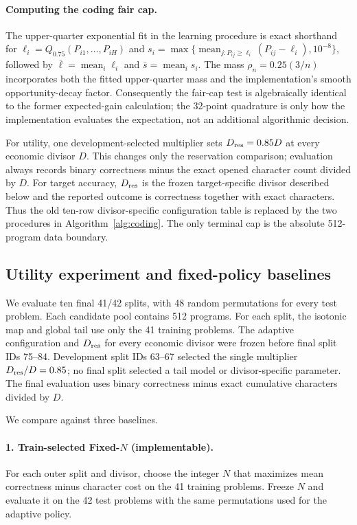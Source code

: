 \paragraph{Computing the coding fair cap.}
The upper-quarter exponential fit in the learning procedure is exact shorthand
for $\ell_i=Q_{0.75}(P_{i1},\ldots,P_{iH})$ and
$s_i=\max\{\operatorname{mean}_{j:P_{ij}\ge\ell_i}
(P_{ij}-\ell_i),10^{-8}\}$, followed by
$\bar\ell=\operatorname{mean}_i\ell_i$ and
$\bar s=\operatorname{mean}_i s_i$.  The mass
$\rho_n=0.25(3/n)$ incorporates both the fitted upper-quarter mass and the
implementation's smooth opportunity-decay factor.  Consequently the fair-cap
test is algebraically identical to the former expected-gain calculation; the
32-point quadrature is only how the implementation evaluates the expectation,
not an additional algorithmic decision.

For utility, one development-selected multiplier sets
$D_{\rm res}=0.85D$ at every economic divisor $D$.  This changes only the
reservation comparison; evaluation always records binary correctness minus
the exact opened character count divided by $D$.  For target accuracy,
$D_{\rm res}$ is the frozen target-specific divisor described below and the
reported outcome is correctness together with exact characters.  Thus the old
ten-row divisor-specific configuration table is replaced by the two procedures
in Algorithm~\ref{alg:coding}.  The only terminal cap is the absolute
512-program data boundary.

\subsection{Utility experiment and fixed-policy baselines}
\label{sec:coding-experiment}

We evaluate ten final 41/42 splits, with 48 random permutations for every
test problem.  Each candidate pool contains 512 programs.  For each split,
the isotonic map and global tail use only the 41 training
problems.  The adaptive configuration and $D_{\rm res}$ for every economic
divisor were frozen before final split IDs 75--84.  Development split IDs
63--67 selected the single multiplier $D_{\rm res}/D=0.85$; no final split
selected a tail model or divisor-specific parameter.  The final evaluation
uses binary correctness minus exact cumulative characters divided by $D$.

We compare against three baselines.

\paragraph{1. Train-selected Fixed-$N$ (implementable).}
For each outer split and divisor, choose the integer $N$ that maximizes mean
correctness minus character cost on the 41 training problems.  Freeze $N$ and
evaluate it on the 42 test problems with the same permutations used for the
adaptive policy.


